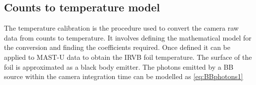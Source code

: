 

\subsection{Counts to temperature model}\label{Counts to temperature model}
The temperature calibration is the procedure used to convert the camera raw data from counts to temperature. It involves defining the mathematical model for the conversion and finding the coefficients required. Once defined it can be applied to MAST-U data to obtain the IRVB foil temperature.
The surface of the foil is approximated as a black body emitter. The photons emitted by a BB source within the camera integration time can be modelled as \autoref{eq:BBphotons1}


